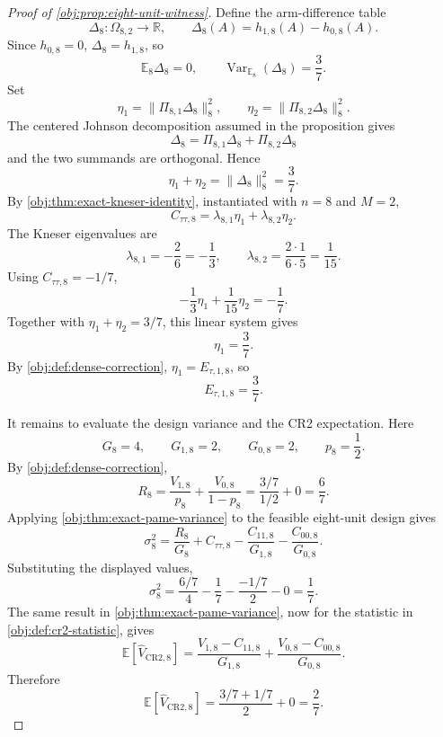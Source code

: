 \begin{proof}[Proof of \cref{obj:prop:eight-unit-witness}]
Define the arm-difference table
\[
\Delta_8:\Omega_{8,2}\to\mathbb R,
\qquad
\Delta_8(A)=h_{1,8}(A)-h_{0,8}(A).
\]
Since \(h_{0,8}=0\), \(\Delta_8=h_{1,8}\), so
\[
\mathbb E_8\Delta_8=0,
\qquad
\operatorname{Var}_{\mathbb E_8}(\Delta_8)=\frac37 .
\]
Set
\[
\eta_1=\|\Pi_{8,1}\Delta_8\|_8^2,
\qquad
\eta_2=\|\Pi_{8,2}\Delta_8\|_8^2 .
\]
The centered Johnson decomposition assumed in the proposition gives
\[
\Delta_8=\Pi_{8,1}\Delta_8+\Pi_{8,2}\Delta_8
\]
and the two summands are orthogonal. Hence
\[
\eta_1+\eta_2
=
\|\Delta_8\|_8^2
=
\frac37 .
\]
By \cref{obj:thm:exact-kneser-identity}, instantiated with \(n=8\) and \(M=2\),
\[
C_{\tau\tau,8}
=
\lambda_{8,1}\eta_1+\lambda_{8,2}\eta_2 .
\]
The Kneser eigenvalues are
\[
\lambda_{8,1}=-\frac{2}{6}=-\frac13,
\qquad
\lambda_{8,2}=\frac{2\cdot 1}{6\cdot 5}=\frac1{15}.
\]
Using \(C_{\tau\tau,8}=-1/7\),
\[
-\frac13\eta_1+\frac1{15}\eta_2=-\frac17 .
\]
Together with \(\eta_1+\eta_2=3/7\), this linear system gives
\[
\eta_1=\frac37 .
\]
By \cref{obj:def:dense-correction}, \(\eta_1=E_{\tau,1,8}\), so
\[
E_{\tau,1,8}=\frac37 .
\]

It remains to evaluate the design variance and the CR2 expectation. Here
\[
G_8=4,\qquad G_{1,8}=2,\qquad G_{0,8}=2,\qquad p_8=\frac12 .
\]
By \cref{obj:def:dense-correction},
\[
R_8=\frac{V_{1,8}}{p_8}+\frac{V_{0,8}}{1-p_8}
=
\frac{3/7}{1/2}+0
=
\frac67 .
\]
Applying \cref{obj:thm:exact-pame-variance} to the feasible eight-unit design gives
\[
\sigma_8^2
=
\frac{R_8}{G_8}
+
C_{\tau\tau,8}
-
\frac{C_{11,8}}{G_{1,8}}
-
\frac{C_{00,8}}{G_{0,8}}.
\]
Substituting the displayed values,
\[
\sigma_8^2
=
\frac{6/7}{4}
-\frac17
-\frac{-1/7}{2}
-0
=
\frac17 .
\]
The same result in \cref{obj:thm:exact-pame-variance}, now for the statistic in \cref{obj:def:cr2-statistic}, gives
\[
\mathbb E\!\left[\widehat V_{\mathrm{CR2},8}\right]
=
\frac{V_{1,8}-C_{11,8}}{G_{1,8}}
+
\frac{V_{0,8}-C_{00,8}}{G_{0,8}}.
\]
Therefore
\[
\mathbb E\!\left[\widehat V_{\mathrm{CR2},8}\right]
=
\frac{3/7+1/7}{2}+0
=
\frac27 .
\]
\end{proof}

